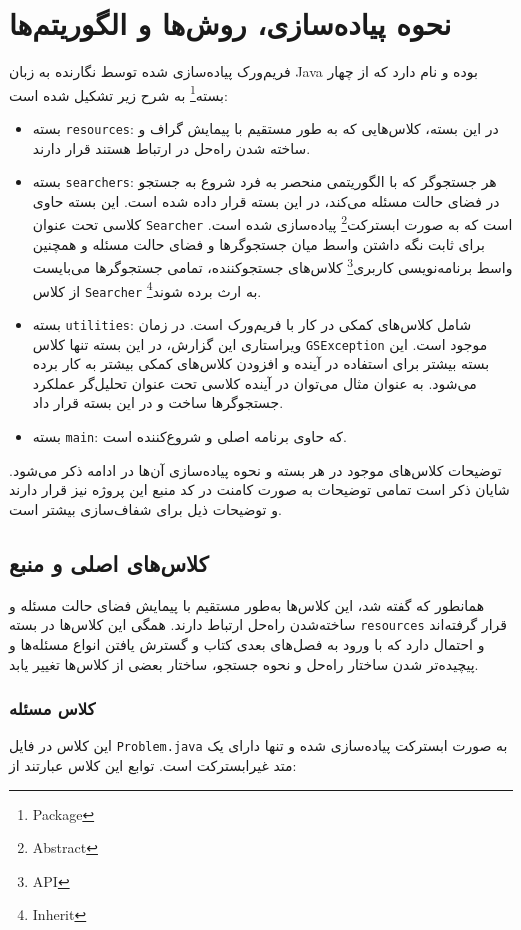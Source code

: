 	\section{نحوه پیاده‌سازی، روش‌ها و الگوریتم‌ها}
	فریم‌ورک پیاده‌سازی شده توسط نگارنده به زبان Java بوده و
	نام دارد که از چهار بسته\footnote{Package} به شرح زیر تشکیل شده است:
	\begin{itemize}
		\item
		بسته 
		\texttt{resources}:
		در این بسته، کلاس‌هایی که به طور مستقیم با پیمایش گراف و ساخته شدن راه‌حل در ارتباط هستند قرار دارند.
		\item
		بسته 
		\texttt{searchers}:
		هر جستجوگر که با الگوریتمی منحصر به فرد شروع به جستجو در فضای حالت مسئله می‌کند، در این بسته قرار داده شده است. این بسته حاوی کلاسی تحت عنوان
		\texttt{Searcher}
		است که به صورت ابسترکت\footnote{Abstract} پیاده‌سازی شده است. برای ثابت نگه داشتن واسط میان جستجوگرها و فضای حالت مسئله و همچنین واسط برنامه‌نویسی کاربری\footnote{API} کلاس‌های جستجوکننده، تمامی جستجوگرها می‌بایست از کلاس
		\texttt{Searcher}
		به ارث برده شوند\footnote{Inherit}.
		\item
		بسته
		\texttt{utilities}:
		شامل کلاس‌های کمکی در کار با فریم‌ورک است. در زمان ویراستاری این گزارش، در این بسته تنها کلاس
		\texttt{GSException}
		موجود است. این بسته بیشتر برای استفاده در آینده و افزودن کلاس‌های کمکی بیشتر به کار برده می‌شود. به عنوان مثال می‌توان در آینده کلاسی تحت عنوان تحلیل‌گر عملکرد جستجوگرها ساخت و در این بسته قرار داد.
		\item
		بسته 
		\texttt{main}:
		که حاوی برنامه اصلی و شروع‌کننده است.
	\end{itemize}
	توضیحات کلاس‌های موجود در هر بسته و نحوه پیاده‌سازی آن‌ها در ادامه ذکر می‌شود. شایان ذکر است تمامی توضیحات به صورت کامنت در کد منبع این پروژه نیز قرار دارند و توضیحات ذیل برای شفاف‌سازی بیشتر است.
	\subsection{کلاس‌های اصلی و منبع}
	همانطور که گفته شد، این کلاس‌ها به‌طور مستقیم با پیمایش فضای حالت مسئله و ساخته‌شدن راه‌حل ارتباط دارند. همگی این کلاس‌ها در بسته
	\texttt{resources}
	قرار گرفته‌اند و احتمال دارد که با ورود به فصل‌های بعدی کتاب و گسترش یافتن انواع مسئله‌ها و پیچیده‌تر شدن ساختار راه‌حل و نحوه جستجو، ساختار بعضی از کلاس‌ها تغییر یابد.
	\subsubsection{کلاس مسئله}
	این کلاس در فایل
	\texttt{Problem.java}
	 به صورت ابسترکت پیاده‌سازی شده و تنها دارای یک متد غیرابسترکت است. توابع این کلاس عبارتند از:
